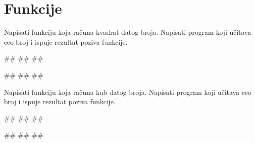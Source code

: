 \section{Funkcije}



\begin{Exercise}[label=v1.4_01] 
Napisati funkciju  koja računa kvadrat datog
broja. Napisati program koji učitava ceo broj i ispuje rezultat poziva
funkcije.

\begin{miditest}
\begin{upotreba}{1}
#\naslovInt#
##
##
\end{upotreba}
\end{miditest}
\begin{miditest}
\begin{upotreba}{2}
#\naslovInt#
##
##
\end{upotreba}
\end{miditest}

\end{Exercise}
\begin{Answer}[ref=v1.4_01]
\end{Answer}


\begin{Exercise}[label=v1.4_01b] 
Napisati funkciju  koja računa kub datog
broja. Napisati program koji učitava ceo broj i ispuje rezultat poziva
funkcije.

\begin{miditest}
\begin{upotreba}{1}
#\naslovInt#
##
##
\end{upotreba}
\end{miditest}
\begin{miditest}
\begin{upotreba}{2}
#\naslovInt#
##
##
\end{upotreba}
\end{miditest}

\end{Exercise}
\begin{Answer}[ref=v1.4_01b]
\end{Answer}


